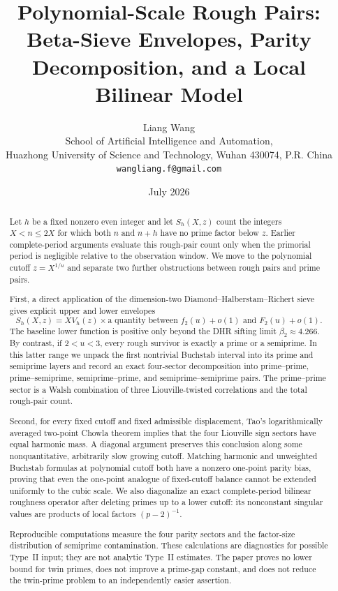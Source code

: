 \documentclass[11pt]{article}
\title{\textbf{Polynomial-Scale Rough Pairs:}\\
\textbf{Beta-Sieve Envelopes, Parity Decomposition, and a Local Bilinear Model}}
\author{Liang Wang\\
\small School of Artificial Intelligence and Automation,\\[-0.2em]
\small Huazhong University of Science and Technology, Wuhan 430074, P.R. China\\
\small \texttt{wangliang.f@gmail.com}}
\date{July 2026}
\theoremstyle{definition}
\theoremstyle{remark}
\begin{document}
\maketitle

\begin{abstract}
Let $h$ be a fixed nonzero even integer and let $S_h(X,z)$ count the integers $X<n\le2X$ for which both $n$ and $n+h$ have no prime factor below $z$.  Earlier complete-period arguments evaluate this rough-pair count only when the primorial period is negligible relative to the observation window.  We move to the polynomial cutoff $z=X^{1/u}$ and separate two further obstructions between rough pairs and prime pairs.

First, a direct application of the dimension-two Diamond--Halberstam--Richert sieve gives explicit upper and lower envelopes
\[
 S_h(X,z)=XV_h(z)\times\text{a quantity between }f_2(u)+o(1)
 \text{ and }F_2(u)+o(1).
\]
The baseline lower function is positive only beyond the DHR sifting limit $\beta_2\approx4.266$.  By contrast, if $2<u<3$, every rough survivor is exactly a prime or a semiprime.  In this latter range we unpack the first nontrivial Buchstab interval into its prime and semiprime layers and record an exact four-sector decomposition into prime--prime, prime--semiprime, semiprime--prime, and semiprime--semiprime pairs.  The prime--prime sector is a Walsh combination of three Liouville-twisted correlations and the total rough-pair count.

Second, for every fixed cutoff and fixed admissible displacement, Tao's logarithmically averaged two-point Chowla theorem implies that the four Liouville sign sectors have equal harmonic mass.  A diagonal argument preserves this conclusion along some nonquantitative, arbitrarily slow growing cutoff.  Matching harmonic and unweighted Buchstab formulas at polynomial cutoff both have a nonzero one-point parity bias, proving that even the one-point analogue of fixed-cutoff balance cannot be extended uniformly to the cubic scale.  We also diagonalize an exact complete-period bilinear roughness operator after deleting primes up to a lower cutoff: its nonconstant singular values are products of local factors $(p-2)^{-1}$.

Reproducible computations measure the four parity sectors and the factor-size distribution of semiprime contamination.  These calculations are diagnostics for possible Type~II input; they are not analytic Type~II estimates.  The paper proves no lower bound for twin primes, does not improve a prime-gap constant, and does not reduce the twin-prime problem to an independently easier assertion.
\end{abstract}
\end{document}
